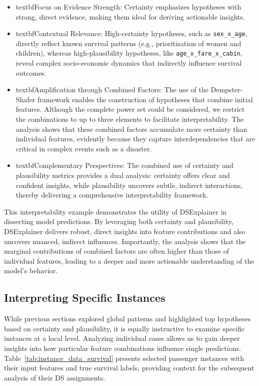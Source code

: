 \documentclass[acmlarge]{acmart}
\begin{document}
\begin{itemize}
    \item textbf{Focus on Evidence Strength:} Certainty emphasizes hypotheses with strong, direct evidence, making them ideal for deriving actionable insights.
    \item textbf{Contextual Relevance:} High-certainty hypotheses, such as \texttt{sex\_x\_age}, directly reflect known survival patterns (e.g., prioritization of women and children), whereas high-plausibility hypotheses, like \texttt{age\_x\_fare\_x\_cabin}, reveal complex socio-economic dynamics that indirectly influence survival outcomes.
    \item textbf{Amplification through Combined Factors:} The use of the Dempster-Shafer framework enables the construction of hypotheses that combine initial features. Although the complete power set could be considered, we restrict the combinations to up to three elements to facilitate interpretability. The analysis shows that these combined factors accumulate more certainty than individual features, evidently because they capture interdependencies that are critical in complex events such as a disaster.
    \item textbf{Complementary Perspectives:} The combined use of certainty and plausibility metrics provides a dual analysis: certainty offers clear and confident insights, while plausibility uncovers subtle, indirect interactions, thereby delivering a comprehensive interpretability framework.
\end{itemize}

This interpretability example demonstrates the utility of DSExplainer in dissecting model predictions. By leveraging both certainty and plausibility, DSExplainer delivers robust, direct insights into feature contributions and also uncovers nuanced, indirect influences. Importantly, the analysis shows that the marginal contributions of combined factors are often higher than those of individual features, leading to a deeper and more actionable understanding of the model's behavior.



\subsection{Interpreting Specific Instances}

While previous sections explored global patterns and highlighted top hypotheses based on certainty and plausibility, it is equally instructive to examine specific instances at a local level. Analyzing individual cases allows us to gain deeper insights into how particular feature combinations influence single predictions. Table~\ref{tab:instance_data_survival} presents selected passenger instances with their input features and true survival labels, providing context for the subsequent analysis of their DS assignments.
\end{document}
